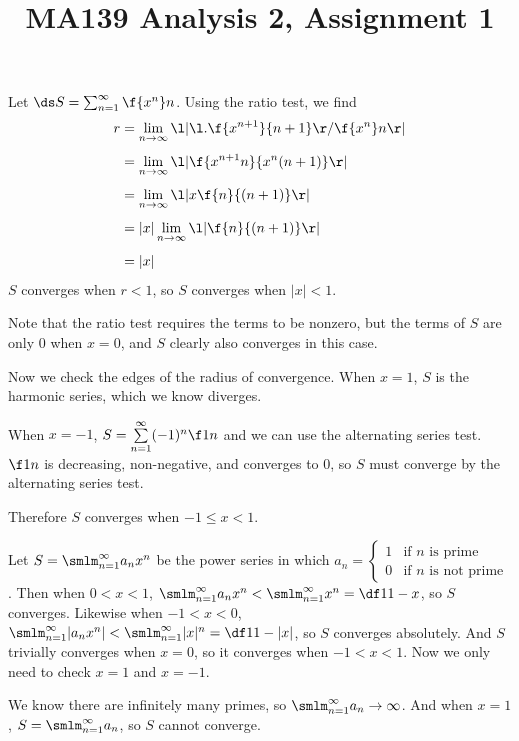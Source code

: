 \documentclass[a4paper]{article}
\title{MA139 Analysis 2, Assignment 1}
\begin{document}
\maketitle

\setlength{\parindent}{0em}
\setlength{\parskip}{1em}


Let $\ds S = \sum_{n=1}^\infty \f{x^n}n$. Using the ratio test, we find \begin{align*}
r &= \lim_{n \to \infty} \l| \l. \f{x^{n+1}}{n+1} \r/ \f{x^n}n \r|\\[1ex]
&= \lim_{n \to \infty} \l| \f{x^{n+1} n}{x^n (n+1)} \r|\\[1ex]
&= \lim_{n \to \infty} \l| x \f{n}{(n+1)} \r|\\[1ex]
&= |x| \lim_{n \to \infty} \l| \f{n}{(n+1)} \r|\\[1ex]
&= |x|
\end{align*}
$S$ converges when $r < 1$, so $S$ converges when $|x| < 1$.

Note that the ratio test requires the terms to be nonzero, but the terms of $S$ are only $0$ when $x=0$, and $S$ clearly also converges in this case.

Now we check the edges of the radius of convergence. When $x=1$, $S$ is the harmonic series, which we know diverges. %

When $x=-1$, $S = \sum\limits_{n=1}^\infty (-1)^n \f1n$ and we can use the alternating series test. $\f1n$ is decreasing, non-negative, and converges to $0$, so $S$ must converge by the alternating series test.

Therefore $S$ converges when $-1 \le x < 1$.


Let $S = \smlm_{n=1}^\infty a_n x^n$ be the power series in which $a_n = \begin{cases}
1 & \text{if } n \text{ is prime}\\
0 & \text{if } n \text{ is not prime}
\end{cases}$. Then when $0 < x < 1$, $\smlm_{n=1}^\infty a_n x^n < \smlm_{n=1}^\infty x^n = \df1{1-x}$, so $S$ converges. Likewise when $-1 < x < 0$, $\smlm_{n=1}^\infty |a_n x^n| < \smlm_{n=1}^\infty |x|^n = \df1{1-|x|}$, so $S$ converges absolutely. And $S$ trivially converges when $x=0$, so it converges when $-1 < x < 1$. Now we only need to check $x=1$ and $x=-1$.

We know there are infinitely many primes, so $\smlm_{n=1}^\infty a_n \to \infty$. And when $x = 1$, $S = \smlm_{n=1}^\infty a_n$, so $S$ cannot converge.
\end{document}

